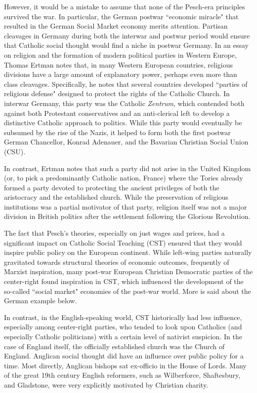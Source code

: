 \documentclass{article}
\begin{document}
However, it would be a mistake to assume that none of the Pesch-era principles survived the war.  In particular, the German postwar ``economic miracle" that resulted in the German Social Market economy merits attention.  Partisan cleavages in Germany during both the interwar and postwar period would ensure that Catholic social thought would find a niche in postwar Germany.  In an essay on religion and the formation of modern political parties in Western Europe, Thomas Ertman notes that, in many Western European countries, religious divisions have a large amount of explanatory power, perhaps even more than class cleavages.\citep{ertman2009western}  Specifically, he notes that several countries developed ``parties of religious defense" designed to protect the rights of the Catholic Church.  In interwar Germany, this party was the Catholic \emph{Zentrum}, which contended both against both Protestant conservatives and an anti-clerical left to develop a distinctive Catholic approach to politics.  While this party would eventually be subsumed by the rise of the Nazis, it helped to form both the first postwar German Chancellor, Konrad Adenauer, and the Bavarian Christian Social Union (CSU).\medskip

In contrast, Ertman notes that such a party did not arise in the United Kingdom (or, to pick a predominantly Catholic nation, France) where the Tories already formed a party devoted to protecting the ancient privileges of both the aristocracy and the established church.  While the preservation of religious institutions was a partial motivator of that party, religion itself was not a major division in British politics after the settlement following the Glorious Revolution.\medskip

The fact that Pesch’s theories, especially on just wages and prices, had a significant impact on Catholic Social Teaching (CST) ensured that they would inspire public policy on the European continent.  While left-wing parties naturally gravitated towards structural theories of economic outcomes, frequently of Marxist inspiration, many post-war European Christian Democratic parties of the center-right found inspiration in CST, which influenced the development of the so-called ``social market" economies of the post-war world.  More is said about the German example below.\medskip

In contrast, in the English-speaking world, CST historically had less influence, especially among center-right parties, who tended to look upon Catholics (and especially Catholic politicians) with a certain level of nativist suspicion.  In the case of England itself, the officially established church was the Church of England.  Anglican social thought did have an influence over public policy for a time.  Most directly, Anglican bishops sat ex-officio in the House of Lords.  Many of the great 19th century English reformers, such as Wilberforce, Shaftesbury, and Gladstone, were very explicitly motivated by Christian charity. \citep{hawtrey2014}\medskip
\end{document}
